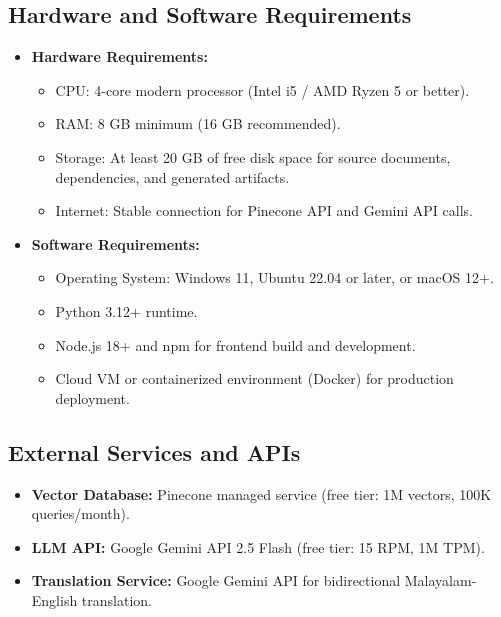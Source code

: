 \documentclass[12pt,a4paper]{report}
\begin{document}
\subsection{Hardware and Software Requirements}
\begin{itemize}
    \item \textbf{Hardware Requirements:}
    \begin{itemize}
        \item CPU: 4-core modern processor (Intel i5 / AMD Ryzen 5 or better).
        \item RAM: 8 GB minimum (16 GB recommended).
        \item Storage: At least 20 GB of free disk space for source documents, dependencies, and generated artifacts.
        \item Internet: Stable connection for Pinecone API and Gemini API calls.
    \end{itemize}
    \item \textbf{Software Requirements:}
    \begin{itemize}
        \item Operating System: Windows 11, Ubuntu 22.04 or later, or macOS 12+.
        \item Python 3.12+ runtime.
        \item Node.js 18+ and npm for frontend build and development.
        \item Cloud VM or containerized environment (Docker) for production deployment.
    \end{itemize}
\end{itemize}

\subsection{External Services and APIs}
\begin{itemize}
    \item \textbf{Vector Database:} Pinecone managed service (free tier: 1M vectors, 100K queries/month).
    \item \textbf{LLM API:} Google Gemini API 2.5 Flash (free tier: 15 RPM, 1M TPM).
    \item \textbf{Translation Service:} Google Gemini API for bidirectional Malayalam-English translation.
\end{itemize}
\end{document}
